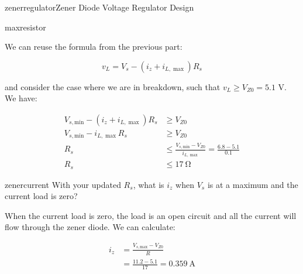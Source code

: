 \begin{mainquestion}{zenerregulator}{Zener Diode Voltage Regulator Design}
\begin{partquestion}{maxresistor}
\begin{answer}
We can reuse the formula from the previous part:

\[
v_L = V_s - (i_z + i_{L,\max}) R_s
\]

and consider the case where we are in breakdown, such that $v_L \geq V_{Z0} = 5.1\text{ V}$. We have:

\begin{align*}
V_{s,\text{min}} - (i_z + i_{L,\max}) R_s &\geq V_{Z0} \\
V_{s,\text{min}} - i_{L,\max} R_s &\geq V_{Z0} \\
R_s &\leq \frac{V_{s,\text{min}} - V_{Z0}}{i_{L,\max}} = \frac{6.8 - 5.1}{0.1} \\
R_s &\leq \qty{17}{\ohm}
\end{align*}

\end{answer}
\end{partquestion}

\begin{partquestion}{zenercurrent}
{With your updated $R_s$, what is $i_z$ when $V_s$ is at a maximum and the current load is zero?}

\begin{answer}
When the current load is zero, the load is an open circuit and all the current will flow through the zener diode. We can calculate:

\begin{align*}
i_z &= \frac{V_{s,\text{max}} - V_{Z0}}{R} \\
&= \frac{11.2 - 5.1}{17} = \qty{0.359}{\ampere}
\end{align*}

\end{answer}
\end{partquestion}

\end{mainquestion}
